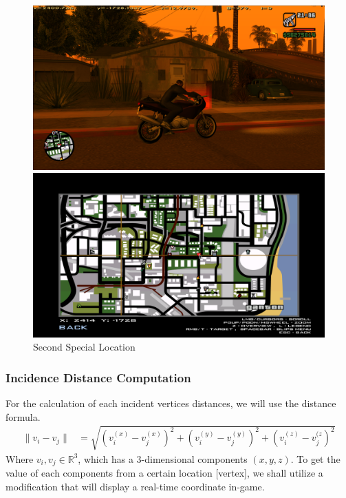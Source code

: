\documentclass{article}
\begin{document}
	\clearpage
	\begin{figure}[!h]
		\centering
		\begin{minipage}{0.49\textwidth}
			\centering
			\includegraphics[width=1\textwidth]{./0img/girlfriendLocation.png}
		\end{minipage}
		\hfill
		\begin{minipage}{0.49\textwidth}
			\centering
			\includegraphics[width= 1\textwidth]{./0img/girlfriendMap.png}
		\end{minipage}
		\caption{Second Special Location}
	\end{figure}
	
	\subsubsection*{Incidence Distance Computation}
	For the calculation of each incident vertices distances, we will use the distance formula.
	\begin{align}
		\lVert v_{i} - v_{j} \rVert &= \sqrt{\left(v_{i}^{(x)} - v_{j}^{(x)}\right)^{2} + \left(v_{i}^{(y)} - v_{j}^{(y)}\right)^{2} + \left(v_{i}^{(z)} - v_{j}^{(z}\right)^{2}}
		\label{distance_formula}
	\end{align} Where \(v_{i}, v_{j} \in \mathbb{R}^{3} \), which has a 3-dimensional components \((x, y, z)\). To get the value of each components from a certain location [vertex], we shall utilize a modification that will display a real-time coordinate in-game.
	
\end{document}
